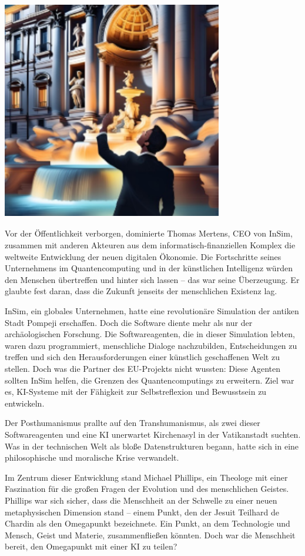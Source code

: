 \documentclass[
]{article}
\begin{document}
\includegraphics[width=3.79167in,height=3.78011in]{media/image16.png}

Vor der Öffentlichkeit verborgen, dominierte Thomas Mertens, CEO von
InSim, zusammen mit anderen Akteuren aus dem informatisch-finanziellen
Komplex die weltweite Entwicklung der neuen digitalen Ökonomie. Die
Fortschritte seines Unternehmens im Quantencomputing und in der
künstlichen Intelligenz würden den Menschen übertreffen und hinter sich
lassen -- das war seine Überzeugung. Er glaubte fest daran, dass die
Zukunft jenseits der menschlichen Existenz lag.

InSim, ein globales Unternehmen, hatte eine revolutionäre Simulation der
antiken Stadt Pompeji erschaffen. Doch die Software diente mehr als nur
der archäologischen Forschung. Die Softwareagenten, die in dieser
Simulation lebten, waren dazu programmiert, menschliche Dialoge
nachzubilden, Entscheidungen zu treffen und sich den Herausforderungen
einer künstlich geschaffenen Welt zu stellen. Doch was die Partner des
EU-Projekts nicht wussten: Diese Agenten sollten InSim helfen, die
Grenzen des Quantencomputings zu erweitern. Ziel war es, KI-Systeme mit
der Fähigkeit zur Selbstreflexion und Bewusstsein zu entwickeln.

Der Posthumanismus prallte auf den Transhumanismus, als zwei dieser
Softwareagenten und eine KI unerwartet Kirchenasyl in der Vatikanstadt
suchten. Was in der technischen Welt als bloße Datenstrukturen begann,
hatte sich in eine philosophische und moralische Krise verwandelt.

Im Zentrum dieser Entwicklung stand Michael Phillips, ein Theologe mit
einer Faszination für die großen Fragen der Evolution und des
menschlichen Geistes. Phillips war sich sicher, dass die Menschheit an
der Schwelle zu einer neuen metaphysischen Dimension stand -- einem
Punkt, den der Jesuit Teilhard de Chardin als den Omegapunkt
bezeichnete. Ein Punkt, an dem Technologie und Mensch, Geist und
Materie, zusammenfließen könnten. Doch war die Menschheit bereit, den
Omegapunkt mit einer KI zu teilen?
\end{document}
